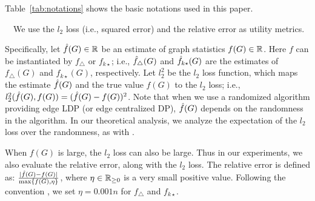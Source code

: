 Table~\ref{tab:notations} shows the basic notations used in this paper.

\smallskip
{}~~We use the $l_2$ loss (i.e., squared error) \cite{Kairouz_ICML16,Wang_USENIX17,Murakami_USENIX19} and the relative error \cite{Bindschaedler_SP16,Chen_CCS12,Xiao_SIGMOD11} as utility metrics. 

Specifically, let 
$\hat{f}(G) \in \mathbb{R}$ be an estimate of graph statistics $f(G) \in \mathbb{R}$. 
Here $f$ can be instantiated by 
$f_\triangle$ or $f_{k\star}$; 
i.e., 
$\hat{f}_\triangle(G)$ and $\hat{f}_{k\star}(G)$ are the estimates of $f_\triangle(G)$ and $f_{k\star}(G)$, respectively. 
Let $l_2^2$ be the $l_2$ loss function, which maps the estimate $\hat{f}(G)$ and the true value $f(G)$ to the $l_2$ loss; i.e., $l_2^2(\hat{f}(G), f(G)) = (\hat{f}(G) - f(G))^2$. 
% 
Note that when we use a randomized algorithm providing edge LDP (or edge centralized DP), $\hat{f}(G)$ depends on the randomness in the algorithm. 
In our theoretical analysis, we analyze the expectation of the $l_2$ loss over 
the randomness, as with \cite{Kairouz_ICML16,Wang_USENIX17,Murakami_USENIX19}. 

When $f(G)$ is large, the $l_2$ loss can also be large. 
Thus in our experiments, we also evaluate the relative error, along with the $l_2$ loss. 
The relative error is defined as: $\frac{|\hat{f}(G) - f(G)|}{\max\{f(G), \eta\}}$, where $\eta \in \mathbb{R}_{\ge0}$ is a very small positive value. 
Following the convention \cite{Bindschaedler_SP16,Chen_CCS12,Xiao_SIGMOD11}, we set $\eta = 0.001n$ 
for $f_\triangle$ and $f_{k\star}$. 
